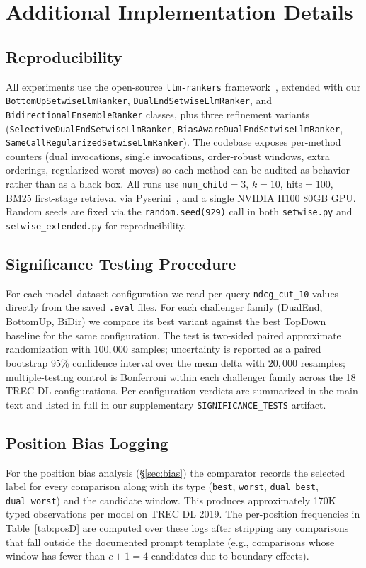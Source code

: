\section{Additional Implementation Details}
\label{sec:appendix}

\subsection{Reproducibility}

All experiments use the open-source \texttt{llm-rankers} framework~\citep{zhuang2024setwise}, extended with our \texttt{BottomUpSetwiseLlmRanker}, \texttt{DualEndSetwiseLlmRanker}, and \texttt{BidirectionalEnsembleRanker} classes, plus three refinement variants (\texttt{SelectiveDualEndSetwiseLlmRanker}, \texttt{BiasAwareDualEndSetwiseLlmRanker}, \texttt{SameCallRegularizedSetwiseLlmRanker}). The codebase exposes per-method counters (dual invocations, single invocations, order-robust windows, extra orderings, regularized worst moves) so each method can be audited as behavior rather than as a black box. All runs use \texttt{num\_child}$=3$, $k=10$, hits$=100$, BM25 first-stage retrieval via Pyserini~\citep{lin2021pyserini}, and a single NVIDIA H100 80GB GPU. Random seeds are fixed via the \texttt{random.seed(929)} call in both \texttt{setwise.py} and \texttt{setwise\_extended.py} for reproducibility.

\subsection{Significance Testing Procedure}

For each model--dataset configuration we read per-query \texttt{ndcg\_cut\_10} values directly from the saved \texttt{.eval} files. For each challenger family (DualEnd, BottomUp, BiDir) we compare its best variant against the best TopDown baseline for the same configuration. The test is two-sided paired approximate randomization with $100{,}000$ samples; uncertainty is reported as a paired bootstrap 95\% confidence interval over the mean delta with $20{,}000$ resamples; multiple-testing control is Bonferroni within each challenger family across the 18 TREC DL configurations. Per-configuration verdicts are summarized in the main text and listed in full in our supplementary \texttt{SIGNIFICANCE\_TESTS} artifact.

\subsection{Position Bias Logging}

For the position bias analysis (\S\ref{sec:bias}) the comparator records the selected label for every comparison along with its type (\texttt{best}, \texttt{worst}, \texttt{dual\_best}, \texttt{dual\_worst}) and the candidate window. This produces approximately 170K typed observations per model on TREC DL 2019. The per-position frequencies in Table~\ref{tab:posD} are computed over these logs after stripping any comparisons that fall outside the documented prompt template (e.g., comparisons whose window has fewer than $c+1=4$ candidates due to boundary effects).
